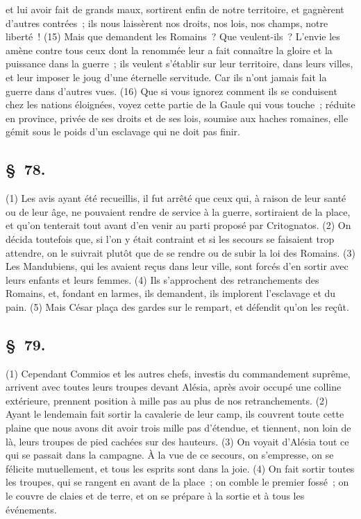 \documentclass[french,twoside]{book} %
\begin{document}
et lui avoir fait de grands maux, sortirent enfin de notre territoire, et gagnèrent d’autres contrées ; ils nous laissèrent nos droits, nos lois, nos champs, notre liberté ! (15) Mais que demandent les Romains ? Que veulent-ils ? L'envie les amène contre tous ceux dont la renommée leur a fait connaître la gloire et la puissance dans la guerre ; ils veulent s’établir sur leur territoire, dans leurs villes, et leur imposer le joug d’une éternelle servitude. Car ils n’ont jamais fait la guerre dans d’autres vues. (16) Que si vous ignorez comment ils se conduisent chez les nations éloignées, voyez cette partie de la Gaule qui vous touche ; réduite en province, privée de ses droits et de ses lois, soumise aux haches romaines, elle gémit sous le poids d’un esclavage qui ne doit pas finir.
\subsection[{§ 78.}]{ \textsc{§ 78.} }
\noindent (1) Les avis ayant été recueillis, il fut arrêté que ceux qui, à raison de leur santé ou de leur âge, ne pouvaient rendre de service à la guerre, sortiraient de la place, et qu’on tenterait tout avant d’en venir au parti proposé par Critognatos. (2) On décida toutefois que, si l’on y était contraint et si les secours se faisaient trop attendre, on le suivrait plutôt que de se rendre ou de subir la loi des Romains. (3) Les Mandubiens, qui les avaient reçus dans leur ville, sont forcés d’en sortir avec leurs enfants et leurs femmes. (4) Ils s’approchent des retranchements des Romains, et, fondant en larmes, ils demandent, ils implorent l’esclavage et du pain. (5) Mais César plaça des gardes sur le rempart, et défendit qu’on les reçût.
\subsection[{§ 79.}]{ \textsc{§ 79.} }
\noindent (1) Cependant Commios et les autres chefs, investis du commandement suprême, arrivent avec toutes leurs troupes devant Alésia, après avoir occupé une colline extérieure, prennent position à mille pas au plus de nos retranchements. (2) Ayant le lendemain fait sortir la cavalerie de leur camp, ils couvrent toute cette plaine que nous avons dit avoir trois mille pas d’étendue, et tiennent, non loin de là, leurs troupes de pied cachées sur des hauteurs. (3) On voyait d’Alésia tout ce qui se passait dans la campagne. À la vue de ce secours, on s’empresse, on se félicite mutuellement, et tous les esprits sont dans la joie. (4) On fait sortir toutes les troupes, qui se rangent en avant de la place ; on comble le premier fossé ; on le couvre de claies et de terre, et on se prépare à la sortie et à tous les événements.
\end{document}
